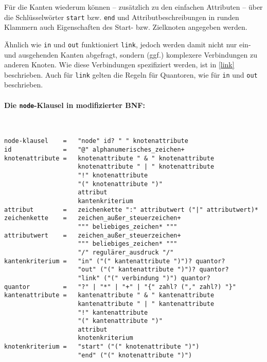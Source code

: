 \documentclass[12pt]{scrartcl}
\begin{document}
Für die Kanten wiederum können – zusätzlich zu den einfachen Attributen – über die Schlüsselwörter \texttt{start} bzw. \texttt{end} und Attributbeschreibungen in runden Klammern auch Eigenschaften des Start- bzw. Zielknoten angegeben werden.

Ähnlich wie \texttt{in} und \texttt{out} funktioniert \texttt{link}, jedoch werden damit nicht nur ein- und ausgehenden Kanten abgefragt, sondern (ggf.) komplexere Verbindungen zu anderen Knoten. Wie diese Verbindungen spezifiziert werden, ist in \ref{link} beschrieben. Auch für \texttt{link} gelten die Regeln für Quantoren, wie für \texttt{in} und \texttt{out} beschrieben.

\paragraph*{Die \texttt{node}-Klausel in modifizierter BNF:}
~
\begin{framed}
\begin{lstlisting}
node-klausel    =   "node" id? " " knotenattribute
id              =   "@" alphanumerisches_zeichen+
knotenattribute =   knotenattribute " & " knotenattribute
                    knotenattribute " | " knotenattribute
                    "!" knotenattribute
                    "(" knotenattribute ")"
                    attribut
                    kantenkriterium
attribut        =   zeichenkette ":" attributwert ("|" attributwert)*
zeichenkette    =   zeichen_außer_steuerzeichen+
                    """ beliebiges_zeichen* """
attributwert    =   zeichen_außer_steuerzeichen+
                    """ beliebiges_zeichen* """
                    "/" regulärer_ausdruck "/"
kantenkriterium =   "in" ("(" kantenattribute ")")? quantor?
                    "out" ("(" kantenattribute ")")? quantor?
                    "link" ("(" verbindung ")") quantor?
quantor         =   "?" | "*" | "+" | "{" zahl? ("," zahl?) "}"
kantenattribute =   kantenattribute " & " kantenattribute
                    kantenattribute " | " kantenattribute
                    "!" kantenattribute
                    "(" kantenattribute ")"
                    attribut
                    knotenkriterium
knotenkriterium =   "start" ("(" knotenattribute ")")
                    "end" ("(" knotenattribute ")")
\end{lstlisting}
\end{framed}
\end{document}
